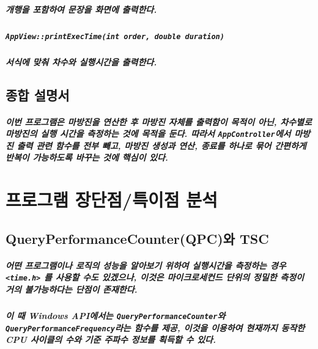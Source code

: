 \documentclass[UTF8]{report}
\begin{document}
            \paragraph{%
                \normalfont 개행을 포함하여 문장을 화면에 출력한다.
            }

            \paragraph{\texttt{AppView::printExecTime(int order, double duration)}}
            \paragraph{%
                \normalfont 서식에 맞춰 차수와 실행시간을 출력한다.
            }


        \section{종합 설명서}

            \paragraph{%
                \normalfont 이번 프로그램은 마방진을 연산한 후 마방진 자체를 출력함이 목적이 아닌, 차수별로 마방진의 실행 시간을 측정하는 것에 목적을 둔다. 따라서 \texttt{AppController}에서 마방진 출력 관련 함수를 전부 빼고, 마방진 생성과 연산, 종료를 하나로 묶어 간편하게 반복이 가능하도록 바꾸는 것에 핵심이 있다.
            }


            
    \chapter{프로그램 장단점/특이점 분석}
        \section{QueryPerformanceCounter(QPC)와 TSC}
            \paragraph{%
                \normalfont 어떤 프로그램이나 로직의 성능을 알아보기 위하여 실행시간을 측정하는 경우 \texttt{<time.h>} 를 사용할 수도 있겠으나, 이것은 마이크로세컨드 단위의 정밀한 측정이 거의 불가능하다는 단점이 존재한다. 
            }

            \paragraph{%
                \normalfont 이 때 Windows API에서는 \texttt{QueryPerformanceCounter}와 \texttt{QueryPerformanceFrequency}라는 함수를 제공, 이것을 이용하여 현재까지 동작한 CPU 사이클의 수와 기준 주파수 정보를 획득할 수 있다. 
            }
\end{document}
